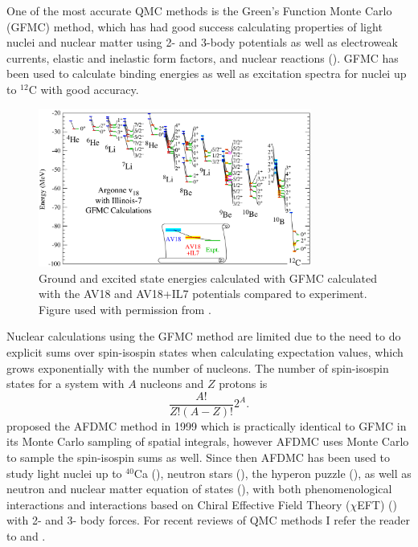 One of the most accurate QMC methods is the Green's Function Monte Carlo (GFMC) method, which has had good success calculating properties of light nuclei and nuclear matter using 2- and 3-body potentials as well as electroweak currents, elastic and inelastic form factors, and nuclear reactions (\cite{carlson2015}). GFMC has been used to calculate binding energies as well as excitation spectra for nuclei up to $^{12}$C with good accuracy.
\begin{figure}[h!]
   \centering
   \includegraphics[width=0.8\textwidth]{figures/gfmc_energies.png}
   \caption{Ground and excited state energies calculated with GFMC calculated with the AV18 and AV18+IL7 potentials compared to experiment. Figure used with permission from \cite{carlson2015}.}
   \label{fig:energy_jaslin}
\end{figure}
Nuclear calculations using the GFMC method are limited due to the need to do explicit sums over spin-isospin states when calculating expectation values, which grows exponentially with the number of nucleons. The number of spin-isospin states for a system with $A$ nucleons and $Z$ protons is
\begin{equation}
   \frac{A!}{Z!(A-Z)!}2^A.
\end{equation}
\cite{schmidt1999} proposed the AFDMC method in 1999 which is practically identical to GFMC in its Monte Carlo sampling of spatial integrals, however AFDMC uses Monte Carlo to sample the spin-isospin sums as well. Since then AFDMC has been used to study light nuclei up to $^{40}$Ca (\cite{gandolfi2007,lonardoni2017}), neutron stars (\cite{gandolfi2014_2,gandolfi2012,tews2018}), the hyperon puzzle (\cite{lonardoni2015,gandolfi2017_2}), as well as neutron and nuclear matter equation of states (\cite{gandolfi2007_2,gandolfi2014,tews2018}), with both phenomenological interactions and interactions based on Chiral Effective Field Theory ($\chi$EFT) (\cite{lonardoni2018_3,lonardoni2018}) with 2- and 3- body forces. For recent reviews of QMC methods I refer the reader to \cite{carlson2015} and \cite{lynn2019}.

